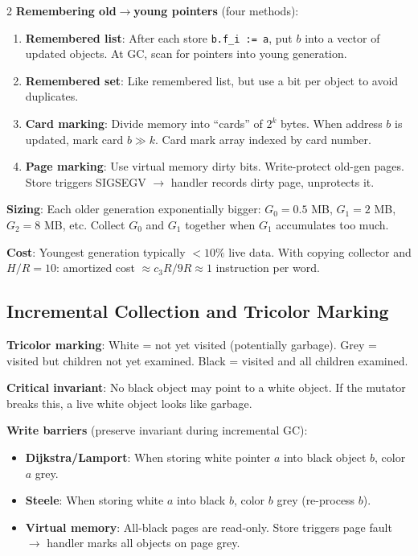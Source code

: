 \documentclass[9pt,landscape]{extarticle}
\begin{document}
\begin{multicols}{2}
\textbf{Remembering old$\to$young pointers} (four methods):
\begin{enumerate}
  \item \textbf{Remembered list}: After each store \texttt{b.f\_i := a}, put $b$ into a vector of updated objects. At GC, scan for pointers into young generation.
  \item \textbf{Remembered set}: Like remembered list, but use a bit per object to avoid duplicates.
  \item \textbf{Card marking}: Divide memory into ``cards'' of $2^k$ bytes. When address $b$ is updated, mark card $b \gg k$. Card mark array indexed by card number.
  \item \textbf{Page marking}: Use virtual memory dirty bits. Write-protect old-gen pages. Store triggers SIGSEGV $\to$ handler records dirty page, unprotects it.
\end{enumerate}

\textbf{Sizing}: Each older generation exponentially bigger: $G_0 = 0.5$ MB, $G_1 = 2$ MB, $G_2 = 8$ MB, etc. Collect $G_0$ and $G_1$ together when $G_1$ accumulates too much.

\textbf{Cost}: Youngest generation typically $< 10\%$ live data. With copying collector and $H/R = 10$: amortized cost $\approx c_3 R / 9R \approx 1$ instruction per word.

\subsection{Incremental Collection and Tricolor Marking}

\textbf{Tricolor marking}: White = not yet visited (potentially garbage). Grey = visited but children not yet examined. Black = visited and all children examined.

\textbf{Critical invariant}: No black object may point to a white object. If the mutator breaks this, a live white object looks like garbage.

\textbf{Write barriers} (preserve invariant during incremental GC):
\begin{itemize}
  \item \textbf{Dijkstra/Lamport}: When storing white pointer $a$ into black object $b$, color $a$ grey.
  \item \textbf{Steele}: When storing white $a$ into black $b$, color $b$ grey (re-process $b$).
  \item \textbf{Virtual memory}: All-black pages are read-only. Store triggers page fault $\to$ handler marks all objects on page grey.
\end{itemize}


\end{multicols}
\end{document}
